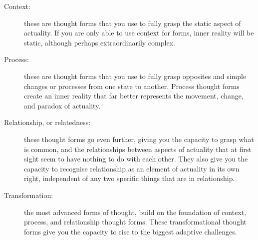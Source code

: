 \begin{description}
\item[Context:] these are thought forms that you use to fully grasp the static aspect of actuality. If you are only able to use context for forms, inner reality will be static, although perhaps extraordinarily complex.
\item[Process:] these are thought forms that you use to fully grasp opposites and simple changes or processes from one state to another. Process thought forms create an inner reality that far better represents the movement, change, and paradox of actuality.
\item[Relationship, or relatedness:] these thought forms go even further, giving you the capacity to grasp what is common, and the relationships between aspects of actuality that at first sight seem to have nothing to do with each other. They also give you the capacity to recognise relationship as an element of actuality in its own right, independent of any two specific things that are in relationship.
\item[Transformation:] the most advanced forms of thought, build on the foundation of context, process, and relationship thought forms. These transformational thought forms give you the capacity to rise to the biggest adaptive challenges.
\end{description}


